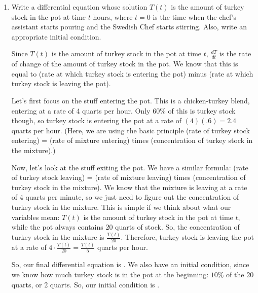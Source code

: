 \documentclass[main]{subfiles}
\begin{document}
\begin{enumerate}
\begin{enumerate}
\item \label{swedish-chef-constant-volume}
\begin{problem}[\vfill]
      Write a differential equation whose solution
    $T(t)$ is the amount of turkey stock in the pot at time $t$ hours, where $t = 0$ is the time when the chef's assistant starts pouring and
    the Swedish Chef starts stirring.  Also, write an appropriate initial
    condition.
    \end{problem}

    \begin{solution}
    Since $T(t)$ is the amount of turkey stock in the pot at time $t$,
    $\frac{dT}{dt}$ is the rate of change of the amount of turkey stock in
    the pot.  We know that this is equal to (rate at which turkey stock is
    entering the pot) minus (rate at which turkey stock is leaving the
    pot).

    Let's first focus on the stuff entering the pot.  This is a
    chicken-turkey blend, entering at a rate of 4 quarts per hour.  Only
    $60\%$ of this is turkey stock though, so turkey stock is entering the
    pot at a rate of $(4)(.6) = 2.4$ quarts per hour.  (Here, we are
    using the basic principle (rate of turkey stock entering) = (rate of
    mixture entering) times (concentration of turkey stock in the
    mixture).)

    Now, let's look at the stuff exiting the pot.  We have a similar
    formula: (rate of turkey stock leaving) = (rate of mixture leaving)
    times (concentration of turkey stock in the mixture).  We know that
    the mixture is leaving at a rate of 4 quarts per minute, so we just
    need to figure out the concentration of turkey stock in the mixture.
    This is simple if we think about what our variables mean: $T(t)$ is
    the amount of turkey stock in the pot at time $t$, while the pot
    always contains 20 quarts of stock.  So, the concentration of turkey
    stock in the mixture is $\frac{T(t)}{20}$.  Therefore, turkey stock is
    leaving the pot at a rate of $4 \cdot \frac{T(t)}{20} =
    \frac{T(t)}{5}$ quarts per hour.

    So, our final differential equation is .  We also have an initial condition, since we know how
    much turkey stock is in the pot at the beginning: $10\%$ of the $20$
    quarts, or 2 quarts.  So, our initial condition is .
    \end{solution}


\end{enumerate}
\end{enumerate}
\end{document}
